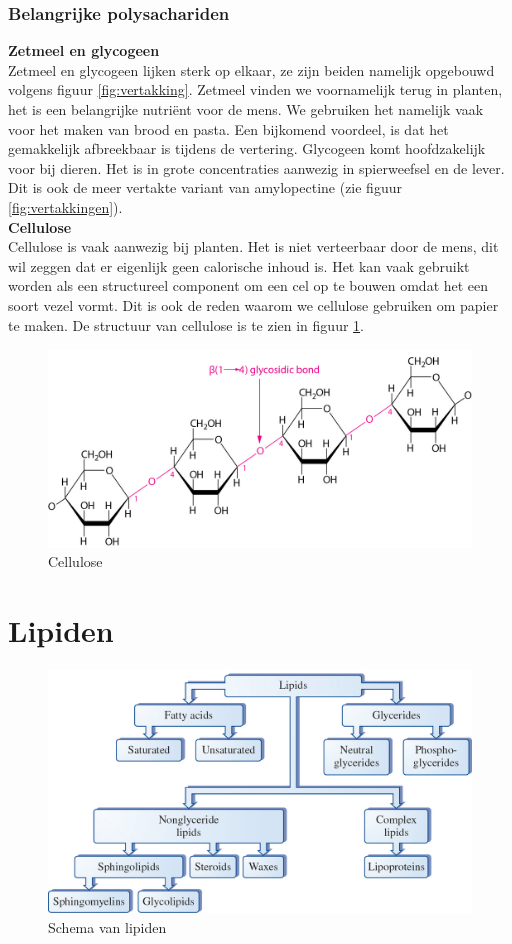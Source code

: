 \documentclass[a4paper,kul]{kulakarticle} %
\begin{document}
\subsubsection{Belangrijke polysachariden}
\textbf{Zetmeel en glycogeen}\\
Zetmeel en glycogeen lijken sterk op elkaar, ze zijn beiden namelijk opgebouwd volgens figuur \ref{fig:vertakking}. Zetmeel vinden we voornamelijk terug in planten, het is een belangrijke nutriënt voor de mens. We gebruiken het namelijk vaak voor het maken van brood en pasta. Een bijkomend voordeel, is dat het gemakkelijk afbreekbaar is tijdens de vertering. Glycogeen komt hoofdzakelijk voor bij dieren. Het is in grote concentraties aanwezig in spierweefsel en de lever. Dit is ook de meer vertakte variant van amylopectine (zie figuur \ref{fig:vertakkingen}).\\
\textbf{Cellulose}\\
Cellulose is vaak aanwezig bij planten. Het is niet verteerbaar door de mens, dit wil zeggen dat er eigenlijk geen calorische inhoud is. Het kan vaak gebruikt worden als een structureel component om een cel op te bouwen omdat het een soort vezel vormt. Dit is ook de reden waarom we cellulose gebruiken om papier te maken. De structuur van cellulose is te zien in figuur \ref{fig:cellulose}.
\begin{figure}[h]
	\centering
	\includegraphics[width=0.7\linewidth]{Cellulose}
	\caption[Cellulose]{Cellulose}
	\label{fig:cellulose}
\end{figure}

\section{Lipiden}
\begin{figure}[htbp]
	\centering
	\includegraphics[width=0.7\linewidth]{Schema_lipiden}
	\caption[Lipiden]{Schema van lipiden}
	\label{fig:schemalipiden}
\end{figure}
\end{document}
